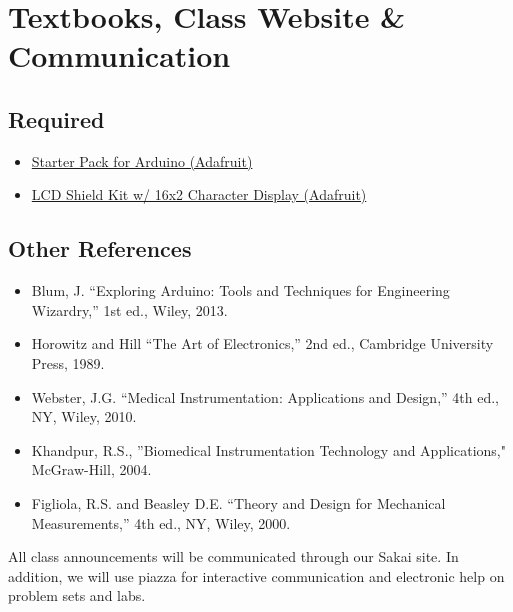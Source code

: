 \section{Textbooks, Class Website \& Communication}

\subsection{Required}
\begin{itemize}
    \item \href{http://www.adafruit.com/products/68}{Starter Pack for Arduino (Adafruit)} 
    \item \href{http://www.adafruit.com/products/772}{LCD Shield Kit w/ 16x2 Character Display (Adafruit)} 

\end{itemize}


\subsection{Other References}
\begin{itemize}
    \item Blum, J. ``Exploring Arduino: Tools and Techniques for Engineering
        Wizardry,'' 1st ed., Wiley, 2013.
\item Horowitz and Hill ``The Art of Electronics,'' 2nd ed., Cambridge
University Press, 1989.
\item Webster, J.G. ``Medical Instrumentation: Applications and Design,'' 4th
ed., NY, Wiley, 2010.
\item Khandpur, R.S., ''Biomedical Instrumentation Technology and Applications,"
McGraw-Hill, 2004.
\item Figliola, R.S. and Beasley D.E. ``Theory and Design for Mechanical
Measurements,'' 4th ed., NY, Wiley, 2000.
\end{itemize}

All class announcements will be communicated through our Sakai site. 
In addition, we will use piazza for interactive communication and 
electronic help on problem sets and labs.
